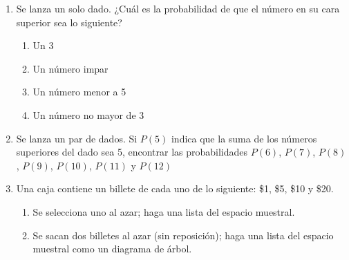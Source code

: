 \documentclass[11pt,twoside]{article}
\begin{document}
\begin{enumerate}
\item Se lanza un solo dado. ¿Cuál es la probabilidad de que el número en su cara superior sea lo siguiente?
\begin{enumerate}
 \item Un 3
 \item Un número impar
 \item Un número menor a 5
 \item Un número no mayor de 3
\end{enumerate}
\item Se lanza un par de dados. Si $P(5)$ indica que la suma de los números superiores del dado sea 5, encontrar las probabilidades $P(6)$, $P(7)$, $P(8)$, $P(9)$, $P(10)$, $P(11)$ y $P(12)$
\item  Una caja contiene un billete de cada uno de lo
siguiente: \$1, \$5, \$10 y \$20.
\begin{enumerate}
 \item Se selecciona uno al azar; haga una lista del espacio muestral.
 \item Se sacan dos billetes al azar (sin reposición); haga una lista del espacio muestral como un diagrama de árbol.
\end{enumerate}
 \end{enumerate}
\end{document}
